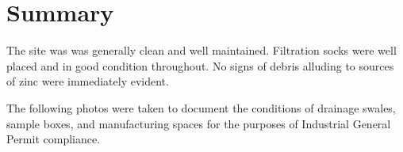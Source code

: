 \documentclass{article}
\begin{document}
\section*{Summary}

The site was was generally clean and well maintained.  Filtration socks were
well placed and in good condition throughout.  No signs of debris alluding to
sources of zinc were immediately evident.

The following photos were taken to document the conditions of drainage swales,
sample boxes, and manufacturing spaces for the purposes of Industrial General
Permit compliance.

\newpage


\end{document}

